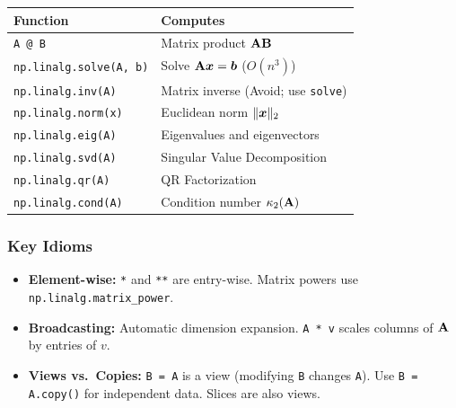 \documentclass[../readings.tex]{subfiles}
\begin{document}
\begin{center}
\begin{tabular}{ll}
\textbf{Function} & \textbf{Computes} \\ \hline
\texttt{A @ B} & Matrix product $\mathbf{A}\mathbf{B}$ \\
\texttt{np.linalg.solve(A, b)} & Solve $\mathbf{A}\boldsymbol{x} = \boldsymbol{b}$ ($O(n^3)$) \\
\texttt{np.linalg.inv(A)} & Matrix inverse (Avoid; use \texttt{solve}) \\
\texttt{np.linalg.norm(x)} & Euclidean norm $\|\boldsymbol{x}\|_2$ \\
\texttt{np.linalg.eig(A)} & Eigenvalues and eigenvectors \\
\texttt{np.linalg.svd(A)} & Singular Value Decomposition \\
\texttt{np.linalg.qr(A)} & QR Factorization \\
\texttt{np.linalg.cond(A)} & Condition number $\kappa_2(\mathbf{A})$ \\
\end{tabular}
\end{center}




\subsubsection{Key Idioms}

\begin{itemize}
  \item \textbf{Element-wise:} \texttt{*} and \texttt{**} are entry-wise. Matrix powers use \texttt{np.linalg.matrix\_power}.
  \item \textbf{Broadcasting:} Automatic dimension expansion. \texttt{A * v} scales columns of $\mathbf{A}$ by entries of $v$.
  \item \textbf{Views vs.\ Copies:} \texttt{B = A} is a view (modifying \texttt{B} changes \texttt{A}). Use \texttt{B = A.copy()} for independent data. Slices are also views.
\end{itemize}
\end{document}
